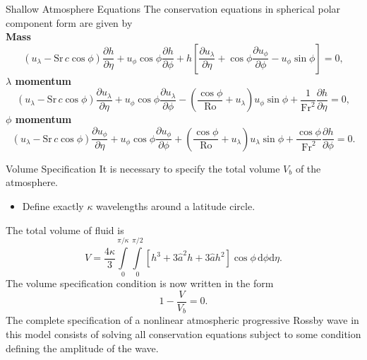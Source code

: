 \documentclass[pdf,distiller]{prosper}
\begin{document}
\begin{slide}{Shallow Atmosphere Equations}
The conservation equations in spherical polar component form are given by\\
{\bfseries Mass}
\begin{equation*}
\left(u_{\lambda}-\mathrm{Sr}\, c \cos\phi\right)\frac{\partial h}{\partial \eta} + u_{\phi}\cos\phi\frac{\partial h}{\partial \phi} + h\left[\frac{\partial u_{\lambda}}{\partial \eta}+\cos\phi\frac{\partial u_{\phi}}{\partial \phi}-u_{\phi}\sin\phi\right]=0, \label{eq:massnon}
\end{equation*}
{\bfseries \boldmath$\lambda$ momentum}
\begin{equation*}
\left(u_{\lambda}-\mathrm{Sr}\, c \cos\phi\right)\frac{\partial u_{\lambda}}{\partial \eta} + u_{\phi}\cos\phi\frac{\partial u_{\lambda}}{\partial \phi} - \left(\frac{\cos\phi}{\mathrm{Ro}} + u_{\lambda}\right)u_{\phi}\sin\phi + \frac{1}{\mathrm{Fr}^2}\frac{\partial h}{\partial \eta} = 0, \label{eq:lamnon}
\end{equation*}
{\bfseries \boldmath$\phi$ momentum}
\begin{equation*}
\left(u_{\lambda}-\mathrm{Sr}\, c \cos\phi\right)\frac{\partial u_{\phi}}{\partial \eta} + u_{\phi}\cos\phi\frac{\partial u_{\phi}}{\partial \phi} + \left(\frac{\cos\phi}{\mathrm{Ro}} + u_{\lambda}\right)u_{\lambda}\sin\phi + \frac{\cos\phi}{\mathrm{Fr}^2}\frac{\partial h}{\partial \phi} = 0. \label{eq:phinon}
\end{equation*}
\end{slide}

\begin{slide}{Volume Specification}
It is necessary to specify the total volume $V_b$ of the atmosphere. 
\begin{itemize}
\item Define exactly $\kappa$ wavelengths around a latitude circle.
\end{itemize}
The total volume of fluid is
\begin{equation*}
	V=\frac{4\kappa}{3} \int\limits_0^{\pi/\kappa} \int\limits_0^{\pi/2} \left[ h^3+3\hat{a}^2h+3\hat{a}h^2  \right]\cos\phi \,\mathrm{d}\phi \mathrm{d}\eta .
\label{eq:volnl}
\end{equation*}
The volume specification condition is now written in the form
\begin{equation*}
1-\frac{V}{V_b}=0. \label{eq:volcon}
\end{equation*}
The complete specification of a nonlinear atmospheric progressive Rossby wave in this model consists of solving all conservation equations subject to some condition defining the amplitude of the wave.
\end{slide}
\end{document}
